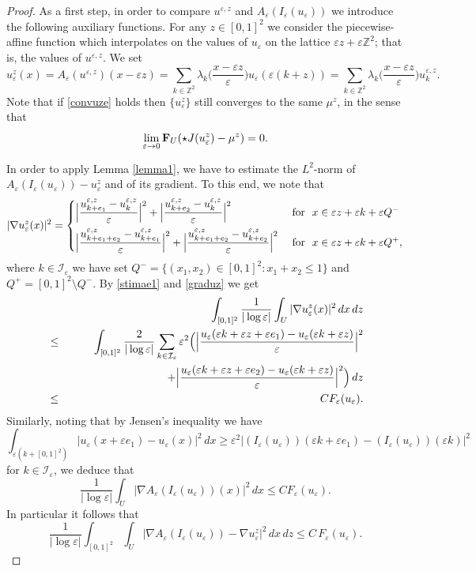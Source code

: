 \documentclass[11pt]{article}
\def\e{\varepsilon}
\def\dx{\,dx}
\begin{document}
\begin{proof}
\medskip
As a first step, in order to compare $u^{\e,z}$ and $A_\e(I_\e (u_\e))$ we introduce the following auxiliary functions. For any $z\in [0,1]^2$ we consider the piecewise-affine function which interpolates on the values of $u_\e$ on the lattice $\e z+\e \mathbb Z^2$; that is, the values of $u^{\e,z}$. We set 
$$u_\e^z(x)=A_\e(u^{\e,z})(x-\e z)=\sum_{k\in\mathbb Z^2}\lambda_k\Big(\frac{x-\e z}{\e}\Big) u_\e(\e (k+z))=\sum_{k\in\mathbb Z^2}\lambda_k\Big(\frac{x-\e z}{\e}\Big) u_k^{\e,z}.$$ 
Note that if \eqref{convuze} holds then $\{u_\e^z\}$ still converges to the same $\mu^z$,  in the sense that \begin{equation}\label{convuze-2}
\lim_{\e\to 0}{\bf F}_U(\star J(u^z_\e)-\mu^z)=0.
\end{equation}

In order to apply Lemma \ref{lemma1}, we have to estimate 
the $L^2$-norm of $A_\e(I_\e(u_\e))-u^z_\e$ and of its gradient. 
To this end, we note that  
\begin{equation}\label{graduz}
|\nabla u_\e^z(x)|^2=
\begin{cases}
\vspace{2mm}\displaystyle \Big|\frac{u_{k+e_1}^{\e,z}-u_{k}^{\e,z}}{\e}\Big|^2+
\Big|\frac{u_{k+e_2}^{\e,z}-u_{k}^{\e,z}}{\e}\Big|^2 &\hbox{ for }\ x\in\e z+\e k+ \e Q^-\\
\displaystyle \Big|\frac{u_{k+e_1+e_2}^{\e,z}-u_{k+e_1}^{\e,z}}{\e}\Big|^2+
\Big|\frac{u_{k+e_1+e_2}^{\e,z}-u_{k+e_2}^{\e,z}}{\e}\Big|^2 &\hbox{ for }\ x\in\e z+ \e k+ \e Q^+, 
\end{cases}
\end{equation} 
where $k\in\mathcal I_\e$ we have set $Q^-=\{(x_1,x_2)\in[0,1]^2: x_1+x_2\leq 1\}$ and $Q^+=[0,1]^2\setminus Q^-$. 
By \eqref{stimae1} and \eqref{graduz} we get 
\begin{eqnarray*}
&&\hspace{-2cm}\int_{[0,1]^2}\frac{1}{|\log\e|}\int_U |\nabla u_\e^z(x)|^2\, dx\, dz\\ 
&\le&
\int_{[0,1]^2}\frac{2}{|\log\e|}\sum_{k\in\mathcal I_\e} \e^2\Big(\Big|\frac{u_\e(\e k+\e z+\e e_1)-u_\e(\e k+\e z)}{\e}\Big|^2 \\
&&\hskip3.1cm+\Big|\frac{u_\e(\e k+\e z+\e e_2)-u_\e(\e k+\e z)}{\e}\Big|^2\Big)\, dz\\
&\le& CF_\e(u_\e).
\end{eqnarray*}
Similarly, noting that by Jensen's inequality we have 
$$
\int_{\e (k+ [0,1]^2)} |u_\e(x+\e e_1)-u_\e(x)|^2\dx\geq \e^2|(I_\e(u_\e))(\e k+\e e_1)-(I_\e(u_\e))(\e k)|^2$$ 
for $k\in\mathcal I_\e$, we deduce that   
\begin{equation}\label{conf-Aeu-g}
\frac{1}{|\log\e|}
\int_{U} |\nabla A_\e(I_\e(u_\e))(x)|^2\, dx\le C F_\e(u_\e). 
\end{equation} 
In particular it follows that 
\begin{equation}\label{stimagrad}
\frac{1}{|\log\e|}\int_{[0,1]^2}
\int_{U} |\nabla A_\e(I_\e(u_\e))-\nabla u_\e^z|^2\, dx\, dz\le C\,F_\e(u_\e). 
\end{equation} 



\end{proof}
\end{document}
